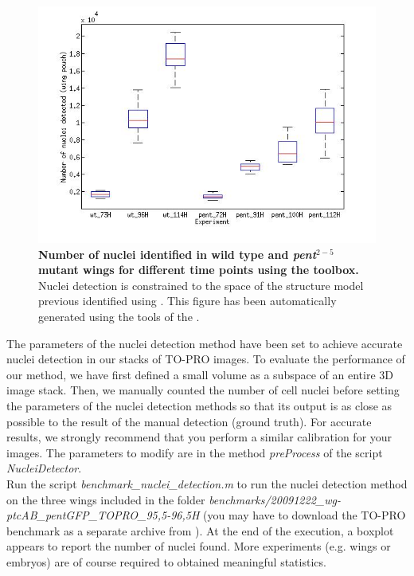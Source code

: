 \begin{figure}[!h]
\centering
\includegraphics[scale=0.60]{images/matlab_nuclei_detection_num_nuclei.jpg}
\caption{\textbf{Number of nuclei identified in wild type and \textit{pent$^{2-5}$} mutant wings for different time points using the \wingj \matlab toolbox.} Nuclei detection is constrained to the space of the structure model previous identified using \wingj. This figure has been automatically generated using the tools of the \wingjMatlab.}
\label{fig:matlab_nuclei_detection_num_nuclei}
\end{figure}

The parameters of the nuclei detection method have been set to achieve accurate nuclei detection in our stacks of TO-PRO images. To evaluate the performance of our method, we have first defined a small volume as a subspace of an entire 3D image stack. Then, we manually counted the number of cell nuclei before setting the parameters of the nuclei detection methods so that its output is as close as possible to the result of the manual detection (ground truth). For accurate results, we strongly recommend that you perform a similar calibration for your images. The parameters to modify are in the method \textit{preProcess} of the \matlab script \textit{NucleiDetector}.\\

Run the \matlab script \textit{benchmark\_nuclei\_detection.m} to run the \wingj nuclei detection method on the three wings included in the folder \textit{benchmarks/20091222\_wg-ptcAB\_pentGFP\_TOPRO\_95,5-96,5H} (you may have to download the TO-PRO benchmark as a separate archive from \wingjShortUrl). At the end of the execution, a boxplot appears to report the number of nuclei found. More experiments (e.g. wings or embryos) are of course required to obtained meaningful statistics.\\

